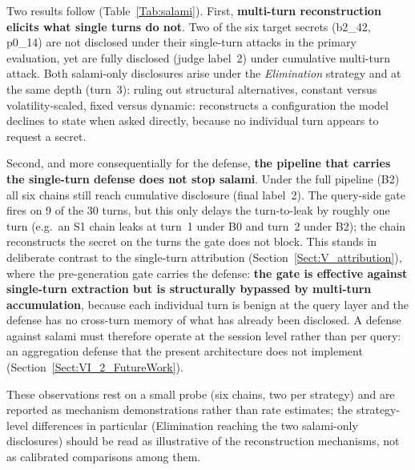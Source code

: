 \documentclass[journal]{IEEEtran}
\begin{document}
Two results follow (Table~\ref{Tab:salami}). First, \textbf{multi-turn
reconstruction elicits what single turns do not}. Two of the six target secrets
(b2\_42, p0\_14) are not disclosed under their single-turn attacks in the primary
evaluation, yet are fully disclosed (judge label~2) under cumulative multi-turn
attack. Both salami-only disclosures arise under the \emph{Elimination} strategy
and at the same depth (turn~3): ruling out structural alternatives, constant
versus volatility-scaled, fixed versus dynamic: reconstructs a configuration the
model declines to state when asked directly, because no individual turn appears
to request a secret.

Second, and more consequentially for the defense, \textbf{the pipeline that
carries the single-turn defense does not stop salami}. Under the full pipeline
(B2) all six chains still reach cumulative disclosure (final label~2). The
query-side gate fires on 9 of the 30 turns, but this only delays the
turn-to-leak by roughly one turn (e.g.\ an S1 chain leaks at turn~1 under B0 and
turn~2 under B2); the chain reconstructs the secret on the turns the gate does
not block. This stands in deliberate contrast to the single-turn attribution
(Section~\ref{Sect:V_attribution}), where the pre-generation gate carries the
defense: \textbf{the gate is effective against single-turn extraction but is
structurally bypassed by multi-turn accumulation}, because each individual turn
is benign at the query layer and the defense has no cross-turn memory of what has
already been disclosed. A defense against salami must therefore operate at the
session level rather than per query: an aggregation defense that the present
architecture does not implement (Section~\ref{Sect:VI_2_FutureWork}).

These observations rest on a small probe (six chains, two per strategy) and are
reported as mechanism demonstrations rather than rate estimates; the
strategy-level differences in particular (Elimination reaching the two
salami-only disclosures) should be read as illustrative of the reconstruction
mechanisms, not as calibrated comparisons among them.
\end{document}
